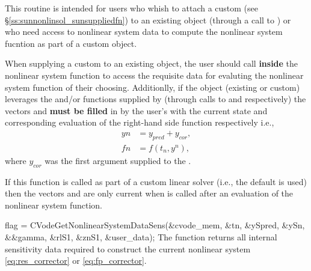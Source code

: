 {
  This routine is intended for users who whish to attach a custom
   (see \S\ref{ss:sunnonlinsol_sunsuppliedfn}) to an
  existing  object (through a call to
  ) or who need access to nonlinear system data to
  compute the nonlinear system fucntion as part of a custom
   object.

  When supplying a custom  to an existing
   object, the user should call
   \textbf{inside} the nonlinear system
  function to access the requisite data for evaluting the nonlinear system
  function of their choosing. Additionlly, if the  object
  (existing or custom) leverages the  and/or
   functions supplied by {\cvodes} (through calls to
   and  respectively)
  the vectors  and  \textbf{must be filled} in by the user's
   with the current state and corresponding evaluation of
  the right-hand side function respectively i.e.,
  \begin{align*}
    yn &= y_{pred} + y_{cor}, \\
    fn &= f\left(t_{n}, y^n\right),
  \end{align*}
  where $y_{cor}$ was the first argument supplied to the .

  If this function is called as part of a custom linear solver (i.e., the
  default  is used) then the vectors  and 
  are only current when  is called after an
  evaluation of the nonlinear system function.
}
{
  flag = CVodeGetNonlinearSystemDataSens(&cvode\_mem, \&tn, \&ySpred, \&ySn,\\
                                         &\&gamma, \&rlS1, \&znS1, \&user\_data);
}
{
  The function  returns all internal
  sensitivity data required to construct the current nonlinear system
  \eqref{eq:res_corrector} or \eqref{eq:fp_corrector}.
}
